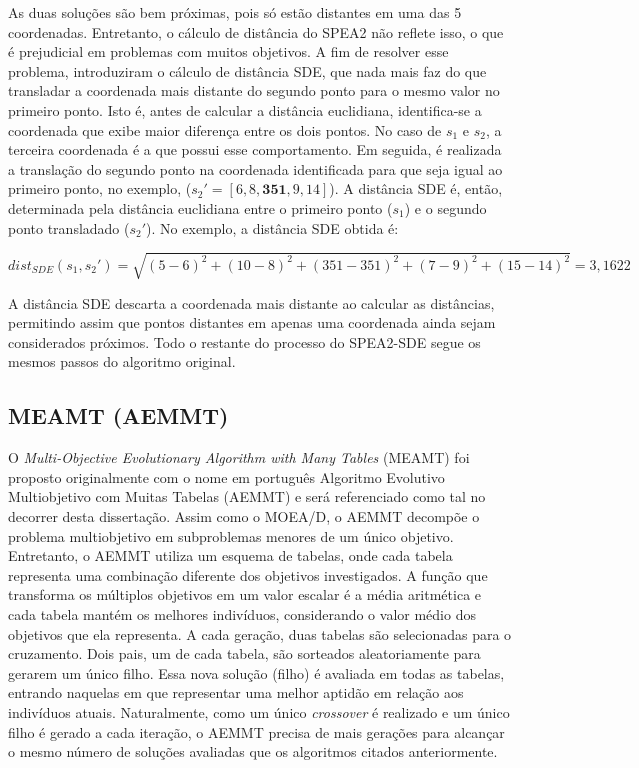 As duas soluções são bem próximas, pois só estão distantes em uma das 5 coordenadas. Entretanto, o cálculo de distância do SPEA2 não reflete isso, o que é prejudicial em problemas com muitos objetivos. A fim de resolver esse problema, \cite{Spea2SDE} introduziram o cálculo de distância \ac{SDE}, que nada mais faz do que transladar a coordenada mais distante do segundo ponto para o mesmo valor no primeiro ponto. Isto é, antes de calcular a distância euclidiana, identifica-se a coordenada que exibe maior diferença entre os dois pontos. No caso de $s_1$ e $s_2$, a terceira coordenada é a que possui esse comportamento. Em seguida, é realizada a translação do segundo ponto na coordenada identificada para que seja igual ao primeiro ponto, no exemplo, ($s_2' = [6, 8, \textbf{351}, 9, 14]$). A distância SDE é, então, determinada pela distância euclidiana entre o primeiro ponto ($s_1$) e o segundo ponto transladado ($s_2'$). No exemplo, a distância SDE obtida é: 

\begin{equation}dist_{SDE}(s_1, s_2') = \sqrt{(5-6)^2 + (10-8)^2 + (351-351)^2 + (7-9)^2 + (15-14)^2} = 3,1622\end{equation}

A distância SDE descarta a coordenada mais distante ao calcular as distâncias, permitindo assim que pontos distantes em apenas uma coordenada ainda sejam considerados próximos. Todo o restante do processo do SPEA2-SDE segue os mesmos passos do algoritmo original.

\subsection{MEAMT (AEMMT)}

O \textit{Multi-Objective Evolutionary Algorithm with Many Tables} (MEAMT) \cite{Brasil2013} foi proposto originalmente com o nome em português Algoritmo Evolutivo Multiobjetivo com Muitas Tabelas (AEMMT) e será referenciado como tal no decorrer desta dissertação. Assim como o MOEA/D, o AEMMT decompõe o problema multiobjetivo em subproblemas menores de um único objetivo. Entretanto, o AEMMT utiliza um esquema de tabelas, onde cada tabela representa uma combinação diferente dos objetivos investigados. A função que transforma os múltiplos objetivos em um valor escalar é a média aritmética e cada tabela mantém os melhores indivíduos, considerando o valor médio dos objetivos que ela representa. A cada geração, duas tabelas são selecionadas para o cruzamento. Dois pais, um de cada tabela, são sorteados aleatoriamente para gerarem um único filho. Essa nova solução (filho) é avaliada em todas as tabelas, entrando naquelas em que representar uma melhor aptidão em relação aos indivíduos atuais. Naturalmente, como um único \textit{crossover} é realizado e um único filho é gerado a cada iteração, o AEMMT precisa de mais gerações para alcançar o mesmo número de soluções avaliadas que os algoritmos citados anteriormente.

